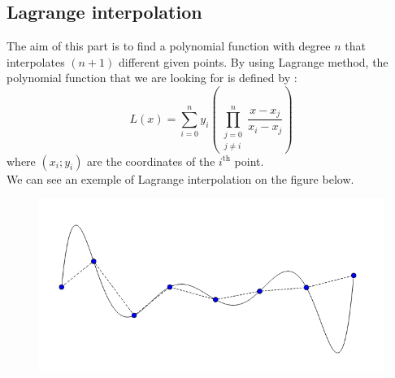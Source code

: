 \documentclass{article}
\begin{document}
\subsection*{Lagrange interpolation}
The aim of this part is to find a polynomial function with degree $n$ that interpolates $(n+1)$ 
different given points. By using Lagrange method, the polynomial function that we are looking for is defined by :
\[ 
	L(x) = \sum_{i=0}^{n}y_i \left(\prod_{\substack{j=0 \\ j\ne i}}^{n}\frac{x-x_j}{x_i-x_j}\right)
\]
where $(x_i;y_i)$ are the coordinates of the $i^{\text{th}}$ point.\\
We can see an exemple of Lagrange interpolation on the figure below. 
\begin{figure}[H]
	\center
   \includegraphics[scale = 0.35]{Pictures/lag1.png}
\end{figure}
\end{document}
